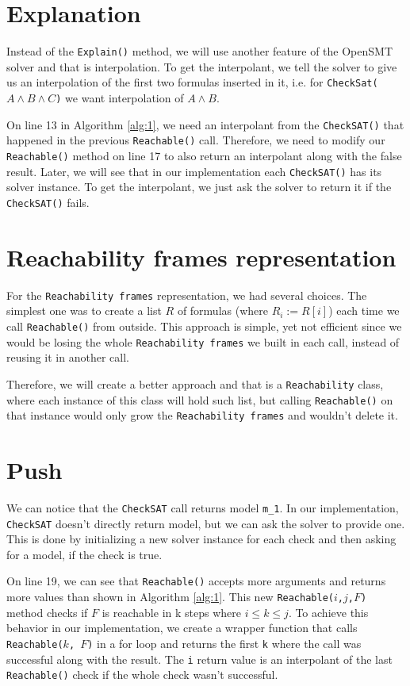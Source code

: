 \section*{Explanation} \label{Explain}
\noindent Instead of the \texttt{Explain()} method, we will use another feature of the OpenSMT solver and that is interpolation. To get the interpolant, we tell the solver to give us an interpolation of the first two formulas inserted in it, i.e. for \texttt{CheckSat($A \wedge B \wedge C$)} we want interpolation of $A \wedge B$.

On line 13 in Algorithm \ref{alg:1}, we need an interpolant from the \texttt{CheckSAT()} that happened in the previous \texttt{Reachable()} call. Therefore, we need to modify our \texttt{Reachable()} method on line 17 to also return an interpolant along with the false result. Later, we will see that in our implementation each \texttt{CheckSAT()} has its solver instance. To get the interpolant, we just ask the solver to return it if the \texttt{CheckSAT()} fails.

\section*{Reachability frames representation}\label{RFrames}
\noindent For the \texttt{Reachability frames} representation, we had several choices. The simplest one was to create a list $R$ of formulas (where $R_i := R[i]$) each time we call \texttt{Reachable()} from outside. This approach is simple, yet not efficient since we would be losing the whole \texttt{Reachability frames} we built in each call, instead of reusing it in another call.

Therefore, we will create a better approach and that is a \texttt{Reachability} class, where each instance of this class will hold such list, but calling \texttt{Reachable()} on that instance would only grow the \texttt{Reachability frames} and wouldn't delete it.

\section*{Push}
We can notice that the \texttt{CheckSAT}
call returns model \texttt{m\_1}. In our implementation, \texttt{CheckSAT}
doesn't directly return model, but we can ask the solver to provide one. This
is done by initializing a new solver instance for each check and then asking
for a model, if the check is true.

On line 19, we can see that \texttt{Reachable()} accepts more arguments and
returns more values than shown in Algorithm
\ref{alg:1}. This new
\texttt{Reachable($i$,$j$,$F$)} method checks if $F$ is reachable in k steps
where $i\leq k \leq j$. To achieve this behavior in our implementation, we
create a wrapper function that calls \texttt{Reachable($k$, $F$)} in a for loop
and returns the first \texttt{k} where the call was successful along with the
result. The \texttt{i} return value is an interpolant of the last
\texttt{Reachable()} check if the whole check wasn't successful.


